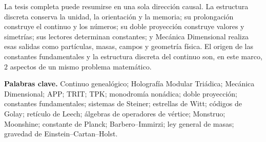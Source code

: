 La tesis completa puede resumirse en una sola dirección causal. La estructura
discreta conserva la unidad, la orientación y la memoria; su prolongación
construye el continuo y los números; su doble proyección construye valores y
simetrías; sus lectores determinan constantes; y Mecánica Dimensional realiza
esas salidas como partículas, masas, campos y geometría física. El origen de
las constantes fundamentales y la estructura discreta del continuo son, en
este marco, \(2\) aspectos de un mismo problema matemático.

\medskip
\noindent\textbf{Palabras clave.}
Continuo genealógico; Holografía Modular Triádica; Mecánica Dimensional;
APP; TRIT; TPK; monodromía nonádica; doble proyección; constantes
fundamentales; sistemas de Steiner; estrellas de Witt; códigos de Golay;
retículo de Leech; álgebras de operadores de vértice; Monstruo; Moonshine;
constante de Planck; Barbero--Immirzi; ley general de masas; gravedad de
Einstein--Cartan--Holst.

\ifdefined\HMTTeoremaGeneradorFrontalCargado
\else
  \clearpage
  
\fi
